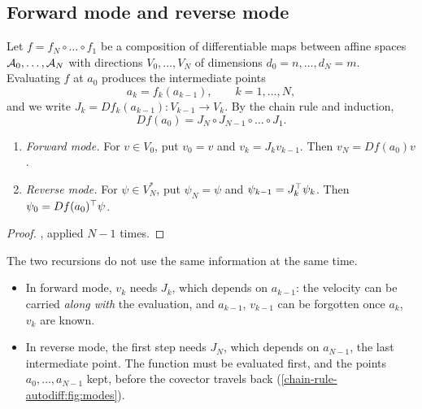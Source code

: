 \begin{notechapter}
\section{Forward mode and reverse mode}
\label{chain-rule-autodiff:sec:modes}

Let $f = f_N\circ\dots\circ f_1$ be a composition of differentiable maps
between affine spaces $\mathcal{A}_0,\dots,\mathcal{A}_N$ with directions
$V_0,\dots,V_N$ of dimensions $d_0 = n,\dots,d_N = m$. Evaluating $f$ at
$a_0$ produces the intermediate points
\[
  a_k = f_k(a_{k-1}), \qquad k = 1,\dots,N,
\]
and we write $J_k = Df_k(a_{k-1}):V_{k-1}\to V_k$. By the chain rule and
induction,
\[
  Df(a_0) = J_N\circ J_{N-1}\circ\dots\circ J_1 .
\]

\begin{proposition}\label{chain-rule-autodiff:prop:modes}
\begin{enumerate}[nosep]
  \item \emph{Forward mode.} For $v\in V_0$, put $v_0 = v$ and
        $v_k = J_kv_{k-1}$. Then $v_N = Df(a_0)v$.
  \item \emph{Reverse mode.} For $\psi\in V_N^*$, put $\psi_N = \psi$ and
        $\psi_{k-1} = J_k^{\top}\psi_k$. Then
        $\psi_0 = Df(a_0)^{\top}\psi$.
\end{enumerate}
\end{proposition}

\begin{proof}
, applied $N - 1$ times.
\end{proof}

The two recursions do not use the same information at the same time.
\begin{itemize}[nosep]
  \item In forward mode, $v_k$ needs $J_k$, which depends on $a_{k-1}$:
        the velocity can be carried \emph{along with} the evaluation, and
        $a_{k-1}$, $v_{k-1}$ can be forgotten once $a_k$, $v_k$ are known.
  \item In reverse mode, the first step needs $J_N$, which depends on
        $a_{N-1}$, the last intermediate point. The function must be
        evaluated first, and the points $a_0,\dots,a_{N-1}$ kept, before
        the covector travels back (\cref{chain-rule-autodiff:fig:modes}).
\end{itemize}


\end{notechapter}
